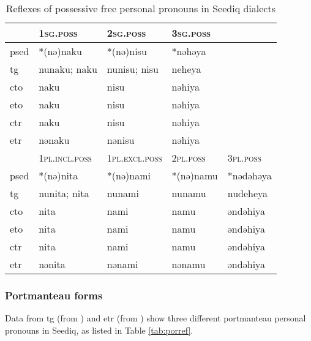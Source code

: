 \begin{table}[!htbp]
\centering
\caption{Reflexes of possessive free personal pronouns in Seediq dialects}
\label{tab:possfree}
\begin{tabular}{lllll}
\hline
      & \textsc{1sg.poss}      & \textsc{2sg.poss}      & \textsc{3sg.poss} &           \\ \hline
\acs{psed} & *(nə)naku       & *(nə)nisu       & *nəhəya &           \\
\acs{tg}  & nunaku; naku      & nunisu; nisu      & neheya     &           \\
\acs{cto}  & naku        & nisu       & nəhiya  &           \\
\acs{eto}  & naku        & nisu       & nəhiya  &           \\
\acs{ctr} & naku        & nisu        & nəhiya  &           \\
\acs{etr} & nənaku        & nənisu        & nəhiya  &           \\ \hline
      & \textsc{1pl.incl.poss} & \textsc{1pl.excl.poss} & \textsc{2pl.poss} & \textsc{3pl.poss}   \\ \hline
\acs{psed} & *(nə)nita       & *(nə)nami       & *(nə)namu  & *nədəhəya \\
\acs{tg}  & nunita; nita     & nunami          & nunamu & nudeheya       \\
\acs{cto}  & nita        & nami        & namu   & əndəhiya  \\
\acs{eto}  & nita        & nami        & namu   & əndəhiya  \\
\acs{ctr} & nita        & nami        & namu   & əndəhiya  \\
\acs{etr} & nənita        & nənami        & nənamu   & əndəhiya  \\ \hline
\end{tabular}
\end{table}

\subsubsection{Portmanteau forms}

Data from \acl{tg} (from \cite[62]{Sung2018Sedgrammar}) and \acl{etr} (from \cite[74]{Lee2018Trugrammar}) show three different portmanteau personal pronouns in Seediq, as listed in Table \ref{tab:porref}.

